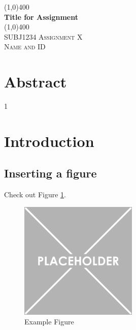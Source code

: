 \documentclass{article}
\begin{document}
	
\begin{titlepage}
	\begin{center}
		
		\vspace{2cm}
		\line(1,0){400}\\
		[1cm]
		\huge{\bfseries Title for Assignment}\\
		[2mm]
		\line(1,0){400}\\
		[1.5cm]
		\textsc{\LARGE SUBJ1234 Assignment X}\\
	\vspace{11.75cm}
		\textsc{\large Name and ID}
	\end{center}
\end{titlepage}


\section*{Abstract}

\newpage
\tableofcontents
\cleardoublepage


\setcounter{page}1


\section{Introduction}

\subsection{Inserting a figure}
Check out Figure \ref{example}.

\begin{figure}[H]
	\centering
	\includegraphics[width = 0.5\textwidth]{Figures/Example}
	\caption{Example Figure}
	\label{example}
\end{figure}
\end{document}

